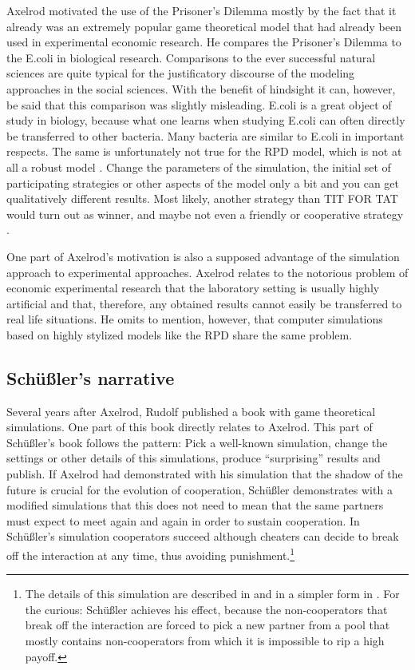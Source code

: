 \documentclass[graybox, English]{svmult}
\begin{document}
Axelrod motivated the use of the Prisoner's Dilemma mostly by the fact
that it already was an extremely popular game theoretical model that
had already been used in experimental economic research. He compares
the Prisoner's Dilemma to the E.coli in biological
research. Comparisons to the ever successful natural sciences are quite
typical for the justificatory discourse of the modeling approaches in
the social sciences. With the benefit of hindsight it can, however, be
said that this comparison was slightly misleading. E.coli is a great
object of study in biology, because what one learns when studying
E.coli can often directly be transferred to other bacteria. Many
bacteria are similar to E.coli in important respects. The same is
unfortunately not true for the RPD model, which is not at all a robust
model \citep[127f.]{arnold:2013b}. Change the parameters of the simulation,
the initial set of participating strategies or other aspects of the
model only a bit and you can get qualitatively different results. Most
likely, another strategy than TIT FOR TAT would turn out as winner,
and maybe not even a friendly or cooperative strategy \citep[315]{binmore:1994}.

One part of Axelrod's motivation is also a supposed advantage of the
simulation approach to experimental approaches. Axelrod relates to the
notorious problem of economic experimental research that the
laboratory setting is usually highly artificial and that, therefore,
any obtained results cannot easily be transferred to real life
situations. He omits to mention, however, that computer simulations
based on highly stylized models like the RPD share the same problem.

\subsection{Schüßler's narrative}

Several years after Axelrod, Rudolf \citet{schuessler:1990} published a
book with game theoretical simulations. One part of this book directly
relates to Axelrod. This part of Schüßler's book follows the pattern:
Pick a well-known simulation, change the settings or other details of
this simulations, produce ``surprising'' results and publish. If
Axelrod had demonstrated with his simulation that the shadow of the
future is crucial for the evolution of cooperation, Schüßler
demonstrates with a modified simulations that this does not need to
mean that the same partners must expect to meet again and again in
order to sustain cooperation. In Schüßler's simulation cooperators
succeed although cheaters can decide to break off the interaction at
any time, thus avoiding punishment.\footnote{The details of this
  simulation are described in \citet[61ff.]{schuessler:1990} and in a
  simpler form in \citet[291ff.]{arnold:2008}. For the curious: Schüßler
  achieves his effect, because the non-cooperators that break off the
  interaction are forced to pick a new partner from a pool that mostly
  contains non-cooperators from which it is impossible to rip a high
  payoff.} 
\end{document}

